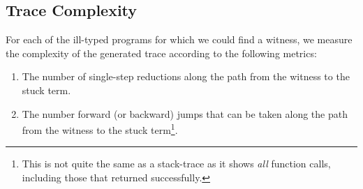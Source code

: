 \subsection{Trace Complexity}
\label{sec:trace-complexity}
For each of the ill-typed programs for which we could find a witness, we
measure the complexity of the generated trace according to the following
metrics:
%
\begin{enumerate}
\item The number of single-step reductions along the path from the
  witness to the stuck term.
\item The number forward (or backward) jumps that can be taken along the
  path from the witness to the stuck term\footnote{This is not quite the same as
  a stack-trace as it shows \emph{all} function calls, including those
  that returned successfully.}.
\end{enumerate}
%
